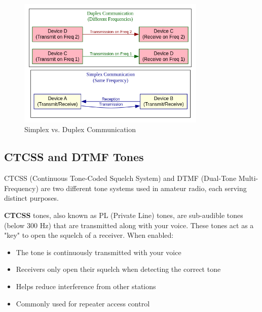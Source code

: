 \begin{figure}[h]
    \centering
    \includegraphics[width=0.8\textwidth]{tech/organized/chapter_2/images/simplex_duplex_diagram.png}
    \caption{Simplex vs. Duplex Communication}
    \label{fig:simplex_duplex}
\end{figure}


\subsection*{CTCSS and DTMF Tones}
CTCSS (Continuous Tone-Coded Squelch System) and DTMF (Dual-Tone Multi-Frequency) are two different tone systems used in amateur radio, each serving distinct purposes.

\textbf{CTCSS} tones, also known as PL (Private Line) tones, are sub-audible tones (below 300 Hz) that are transmitted along with your voice. These tones act as a "key" to open the squelch of a receiver. When enabled:
\begin{itemize}
    \item The tone is continuously transmitted with your voice
    \item Receivers only open their squelch when detecting the correct tone
    \item Helps reduce interference from other stations
    \item Commonly used for repeater access control
\end{itemize}

